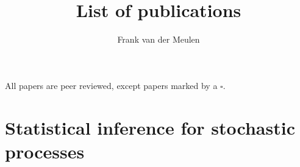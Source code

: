 \documentclass[
10pt, %
a4paper, %
oneside, %
headinclude,footinclude, %
BCOR5mm, %
]{scrartcl}
\title{List of  publications}
\author{Frank van der Meulen}
\begin{document}
%

\maketitle
\tableofcontents


\bigskip

\noindent All papers are peer reviewed, except  papers marked by a $\square$.

\section{Statistical inference for stochastic processes}
\end{document}

